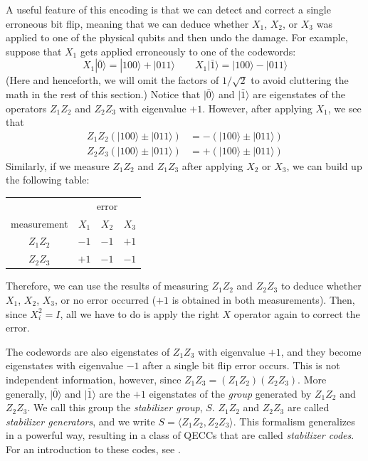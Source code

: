 \documentclass[a4paper,11pt]{article}
\newcommand{\ket}[1]{|#1\rangle}
\begin{document}
A useful feature of this encoding is that we can detect and correct a single erroneous bit flip, meaning that we can deduce whether $X_1$, $X_2$, or $X_3$ was applied to one of the physical qubits and then undo the damage.
For example, suppose that $X_1$ gets applied erroneously to one of the codewords:
\begin{equation}
X_1 \ket{\bar{0}} = \ket{100} + \ket{011} \qquad X_1 \ket{\bar{1}} = \ket{100} - \ket{011}
\end{equation}
(Here and henceforth, we will omit the factors of $1/\sqrt{2}$ to avoid cluttering the math in the rest of this section.)
Notice that $\ket{\bar{0}}$ and $\ket{\bar{1}}$ are eigenstates of the operators $Z_1 Z_2$ and $Z_2 Z_3$ with eigenvalue $+1$.
However, after applying $X_1$, we see that
\begin{equation}
\begin{aligned}
Z_1 Z_2 ( \ket{100} \pm \ket{011} ) &= - ( \ket{100} \pm \ket{011} ) \\
Z_2 Z_3 ( \ket{100} \pm \ket{011} ) &= + ( \ket{100} \pm \ket{011} )
\end{aligned}
\end{equation}
Similarly, if we measure $Z_1 Z_2$ and $Z_1 Z_3$ after applying $X_2$ or $X_3$, we can build up the following table:
\begin{center}
\begin{tabular}{ c | c c c }
~ & \multicolumn{3}{c}{error} \\
measurement & $X_1$ & $X_2$ & $X_3 $  \\
\hline
$Z_1 Z_2$ & $-1$ & $-1$ & $+1$ \\
$Z_2 Z_3$ & $+1$ & $-1$ & $-1$
\end{tabular}
\end{center}
Therefore, we can use the results of measuring $Z_1 Z_2$ and $Z_2 Z_3$ to deduce whether $X_1$, $X_2$, $X_3$, or no error occurred ($+1$ is obtained in both measurements).
Then, since $X_i^2 = I$, all we have to do is apply the right $X$ operator again to correct the error.

The codewords are also eigenstates of $Z_1 Z_3$ with eigenvalue $+1$, and they become eigenstates with eigenvalue $-1$ after a single bit flip error occurs.
This is not independent information, however, since $Z_1 Z_3 = (Z_1 Z_2)(Z_2 Z_3)$.
More generally, $\ket{\bar{0}}$ and $\ket{\bar{1}}$ are the $+1$ eigenstates of the \emph{group} generated by $Z_1 Z_2$ and $Z_2 Z_3$.
We call this group the \emph{stabilizer group}, $S$. $Z_1 Z_2$ and $Z_2 Z_3$ are called \emph{stabilizer generators}, and we write $S = \langle Z_1 Z_2, Z_2 Z_3 \rangle$.
This formalism generalizes in a powerful way, resulting in a class of QECCs that are called \emph{stabilizer codes}.
For an introduction to these codes, see \cite{gottesman}.
\end{document}
